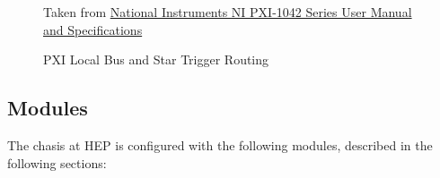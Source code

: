 \begin{figure}[htbp]\begin{center}
  {\tiny
    Taken from \href{Manuals/NI PXI-1042 Series User Manual and Specifications}{National Instruments NI PXI-1042 Series User Manual and Specifications}
  }
  \caption{PXI Local Bus and Star Trigger Routing}
  \label{fig:eq_pxi:chasis_bus}
\end{center}\end{figure}

\subsection{Modules}
\label{sec:eq_pxi:modules}

The chasis at HEP is configured with the following modules, described in the following sections:

%


